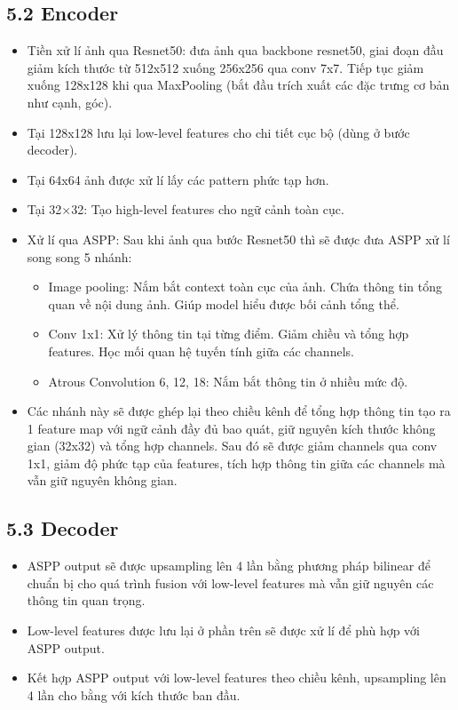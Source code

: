 \documentclass[12pt]{report}
\begin{document}
\subsection*{5.2 Encoder}
\begin{itemize}
    \item Tiền xử lí ảnh qua Resnet50: đưa ảnh qua backbone resnet50, giai đoạn đầu giảm kích thước từ 512x512 xuống 256x256 qua conv 7x7. Tiếp tục giảm xuống 128x128 khi qua MaxPooling (bắt đầu trích xuất các đặc trưng cơ bản như cạnh, góc).
    \item Tại 128x128 lưu lại low-level features cho chi tiết cục bộ (dùng ở bước decoder).
    \item Tại 64x64 ảnh được xử lí lấy các pattern phức tạp hơn.
    \item Tại 32$\times$32: Tạo high-level features cho ngữ cảnh toàn cục.
    \item Xử lí qua ASPP: Sau khi ảnh qua bước Resnet50 thì sẽ được đưa ASPP xử lí song song 5 nhánh:
    \begin{itemize}
        \item Image pooling: Nắm bắt context toàn cục của ảnh. Chứa thông tin tổng quan về nội dung ảnh. Giúp model hiểu được bối cảnh tổng thể.
        \item Conv 1x1: Xử lý thông tin tại từng điểm. Giảm chiều và tổng hợp features. Học mối quan hệ tuyến tính giữa các channels.
        \item Atrous Convolution 6, 12, 18: Nắm bắt thông tin ở nhiều mức độ.
    \end{itemize}
    \item Các nhánh này sẽ được ghép lại theo chiều kênh để tổng hợp thông tin tạo ra 1 feature map với ngữ cảnh đầy đủ bao quát, giữ nguyên kích thước không gian (32x32) và tổng hợp channels. Sau đó sẽ được giảm channels qua conv 1x1, giảm độ phức tạp của features, tích hợp thông tin giữa các channels mà vẫn giữ nguyên không gian.
\end{itemize}

\subsection*{5.3 Decoder}
\begin{itemize}
    \item ASPP output sẽ được upsampling lên 4 lần bằng phương pháp bilinear để chuẩn bị cho quá trình fusion với low-level features mà vẫn giữ nguyên các thông tin quan trọng.
    \item Low-level features được lưu lại ở phần trên sẽ được xử lí để phù hợp với ASPP output.
    \item Kết hợp ASPP output với low-level features theo chiều kênh, upsampling lên 4 lần cho bằng với kích thước ban đầu.
\end{itemize}
\end{document}
